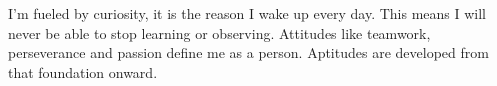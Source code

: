 \documentclass[9pt]{developercv} %
\begin{document}
\vspace{0.5cm}



\begin{minipage}[t]{0.4\textwidth} %
	\vspace{-\baselineskip} %
	I'm fueled by curiosity, it is the reason I wake up every day.
	This means I will never be able to stop learning or observing.
	Attitudes like teamwork, perseverance and passion define me as a person.
	Aptitudes are developed from that foundation onward.\\
\end{minipage}
\hfill %
\begin{minipage}[t]{0.5\textwidth} %
	\vspace{-\baselineskip} %
	\begin{barchart}{5.5}
	\end{barchart}
\end{minipage}


\end{document}
